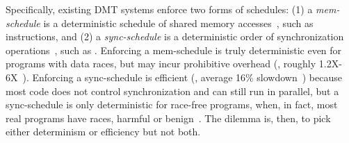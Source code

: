 




Specifically, existing DMT systems enforce two forms of schedules: (1) a
\emph{mem-schedule} is a deterministic schedule of shared memory
accesses~\cite{dmp:asplos09,coredet:asplos10,dos:osdi10}, such as
 instructions, and (2) a \emph{sync-schedule} is a
deterministic order of synchronization
operations~\cite{kendo:asplos09,cui:tern:osdi10}, such as
.  Enforcing a mem-schedule is truly deterministic even
for programs with data races, but may incur prohibitive overhead (\eg,
roughly 1.2X-6X~\cite{coredet:asplos10}).  Enforcing a sync-schedule is
efficient (\eg, average 16\% slowdown~\cite{kendo:asplos09}) because
most code does not control synchronization and can still run in
parallel, but a sync-schedule is only deterministic for race-free
programs, when, in fact, most real programs have races, harmful or
benign~\cite{lu:concurrency-bugs,syncfinder:osdi10}.  The dilemma is,
then, to pick either determinism or efficiency but not both.

